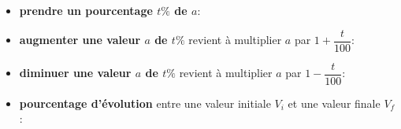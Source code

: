 \def\level{BTS}  %
\def\course{CIEL 2}
\def\chaptername{CIEL2~--~Accompagnement Personnalisé} %
\def\docpart{Révision BTS CIEL 1} %
\def\docname{C201} %
\pagestyle{cours_FP}
\makeheaderBTS{} %

\begin{easybox}[Pourcentages]{}
\begin{itemize}
	\item \textbf{prendre un pourcentage $t \%$ de $a$}: 
	\item \textbf{augmenter une valeur $a$ de $t\%$} revient à multiplier $a$ par $1+\dfrac{t}{100}$: 
	\item \textbf{diminuer une valeur $a$ de $t\%$} revient à multiplier $a$ par $1-\dfrac{t}{100}$: 
	\item \textbf{pourcentage d'évolution} entre une valeur initiale $V_i$ et une valeur finale $V_f$: 
\end{itemize}
\end{easybox}

